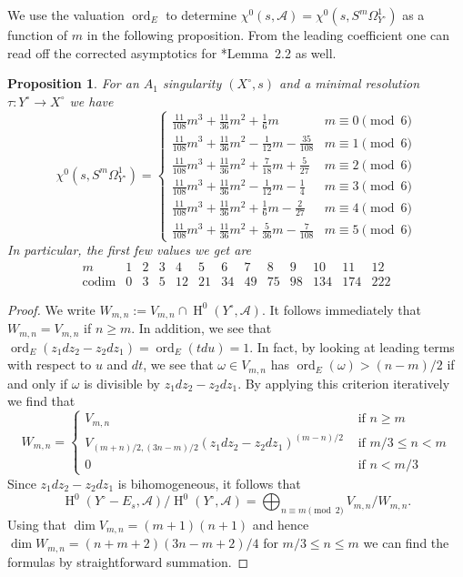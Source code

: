 \documentclass[12pt, reqno]{amsart}
\newtheorem{proposition}[lemma]{Proposition}
\theoremstyle{definition}
\newcommand{\calA}{{\mathcal A}}
\DeclareMathOperator{\HH}{H}
\DeclareMathOperator{\ord}{ord}
\numberwithin{equation}{section}
\numberwithin{table}{section}
\begin{document}
We use the valuation $\ord_E$ to determine $\chi^0(s,\calA) = \chi^0(s,S^m\Omega^1_{Y^\circ})$ as a function of $m$ in the following proposition. From the leading coefficient one can read off the corrected asymptotics for \cite{BO}*{Lemma~2.2} as well.
\begin{proposition}\label{P:codim_E_regular} 
For an $A_1$ singularity $(X^\circ,s)$ and a minimal resolution $\tau\colon Y^\circ\to X^\circ$ we have
	\begin{equation}
	\label{eq:localTerms}
	\chi^0(s,S^m\Omega^1_{Y^\circ}) = 
	\begin{cases}
	\frac{11}{108}m^3 + \frac{11}{36}m^2 + \frac{1}{6}m & m \equiv 0 \pmod 6 \\
	\frac{11}{108}m^3 + \frac{11}{36}m^2 - \frac{1}{12}m - \frac{35}{108} & m \equiv 1 \pmod 6 \\
	\frac{11}{108}m^3 + \frac{11}{36}m^2 + \frac{7}{18}m + \frac{5}{27} & m \equiv 2 \pmod 6 \\
	\frac{11}{108}m^3 + \frac{11}{36}m^2 - \frac{1}{12}m - \frac{1}{4} & m \equiv 3 \pmod 6 \\
	\frac{11}{108}m^3 + \frac{11}{36}m^2 + \frac{1}{6}m - \frac{2}{27} & m \equiv 4 \pmod 6 \\
	\frac{11}{108}m^3 + \frac{11}{36}m^2 + \frac{5}{36}m - \frac{7}{108} & m \equiv 5 \pmod 6 
	\end{cases}
	\end{equation}
	In particular, the first few values we get are
	\[
	\begin{array}{c|cccccccccccc}
	m&1&2&3&4&5&6&7&8&9&10&11&12\\
	\hline
	\mathrm{codim}&0&3&5& 12& 21& 34& 49& 75& 98& 134& 174& 222 
	\end{array}
	\]
\end{proposition}

\begin{proof}
	We write $W_{m,n}:=V_{m,n}\cap \HH^0(Y^\circ,\calA)$.
	It follows immediately that $W_{m,n}=V_{m,n}$ if $n\geq m$.
	In addition, we see that $\ord_E(z_1dz_2-z_2dz_1)=\ord_E(tdu)=1$. In fact, by looking at leading terms with respect to $u$ and $dt$, we see that $\omega\in V_{m,n}$ has $\ord_E(\omega)>(n-m)/2$ if and only if $\omega$ is divisible by $z_1dz_2-z_2dz_1$.
	By applying this criterion iteratively we find that
	\[W_{m,n}=\begin{cases}
	V_{m,n}&\text{ if }n\geq m\\
	V_{(m+n)/2,(3n-m)/2}(z_1dz_2-z_2dz_1)^{(m-n)/2}&\text{ if } m/3\leq n<m\\
	0&\text{ if }n<m/3
	\end{cases}\]
	Since $z_1dz_2-z_2dz_1$ is bihomogeneous, it follows that
	\[
	\HH^0(Y^\circ - E_s,\calA)/\HH^0(Y^\circ,\calA)=\bigoplus_{n\equiv m\pmod{2}} V_{m,n}/W_{m,n}.
	\]
	Using that $\dim V_{m,n}=(m+1)(n+1)$ and hence $\dim W_{m,n}=(n+m+2)(3n-m+2)/4$ for $m/3\leq n\leq m$ we can find the formulas by straightforward summation.
\end{proof}
\end{document}
